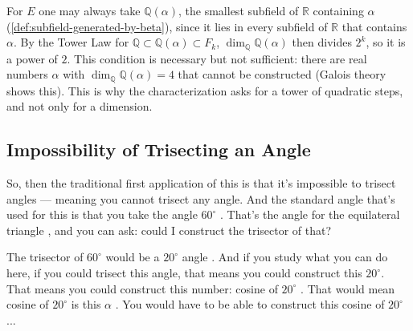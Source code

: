 \begin{aiNote}
For $E$ one may always take $\mathbb{Q}(\alpha)$, the smallest subfield of $\mathbb{R}$ containing $\alpha$ (\cref{def:subfield-generated-by-beta}), since it lies in every subfield of $\mathbb{R}$ that contains $\alpha$. By the Tower Law for $\mathbb{Q} \subset \mathbb{Q}(\alpha) \subset F_k$, $\dim_{\mathbb{Q}} \mathbb{Q}(\alpha)$ then divides $2^k$, so it is a power of $2$. This condition is necessary but not sufficient: there are real numbers $\alpha$ with $\dim_{\mathbb{Q}} \mathbb{Q}(\alpha) = 4$ that cannot be constructed (Galois theory shows this). This is why the characterization asks for a tower of quadratic steps, and not only for a dimension.
\end{aiNote}

\subsection{Impossibility of Trisecting an Angle}

\begin{speech}[00:42:25 - 00:43:24]
So, then the traditional first application of this is that it's impossible to trisect angles  --- meaning you cannot trisect any angle. And the standard angle that's used for this is that you take the angle $60^\circ$ . That's the angle for the equilateral triangle , and you can ask: could I construct the trisector of that?

The trisector of $60^\circ$ would be a $20^\circ$ angle . And if you study what you can do here, if you could trisect this angle, that means you could construct this $20^\circ$. That means you could construct this number: cosine of $20^\circ$ . That would mean cosine of $20^\circ$ is this $\alpha$ . You would have to be able to construct this cosine of $20^\circ$...
\end{speech}

